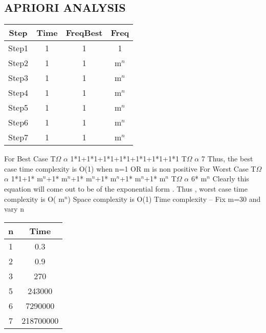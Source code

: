\documentclass[conference]{IEEEtran}
\begin{document}
\subsection{APRIORI ANALYSIS }
\begin{center}
   \begin{tabular}{|c|c|c|c}
   \hline
   Step&Time&FreqBest&Freq \\
   \hline\hline
   Step1 & 1 & 1 &  1 \\
    \hline
   Step2 & 1 & 1 &  m$^{n}$\\
    \hline
   Step3 & 1 & 1 &  m$^{n}$\\
    \hline
   Step4 & 1 & 1 &  m$^{n}$\\
    \hline
  Step5 & 1 & 1 &  m$^{n}$\\
  \hline
  Step6 & 1 & 1 &  m$^{n}$\\
    \hline
    Step7 & 1 & 1 &  m$^{n}$ \\
    \hline
    \end{tabular} 
\end{center}
For Best Case
\newline
T$\Omega$ $\alpha$ 1*1+1*1+1*1+1*1+1*1+1*1+1*1
\newline
T$\Omega$ $\alpha$ 7
\newline
Thus, the best case time complexity is O(1) when n=1 OR m is non positive
\newline
For Worst Case
\newline
T$\Omega$ $\alpha$ 1*1+1* m$^{n}$+1* m$^{n}$+1* m$^{n}$+1* m$^{n}$+1*  m$^{n}$+1* m$^{n}$
\newline
T$\Omega$ $\alpha$ 6* m$^{n}$
\newline
Clearly this equation will come out to be of the exponential form .
\newline
Thus , worst case time complexity is O( m$^{n}$)
\newline
Space complexity is O(1)
\newline
Time complexity –
\newline
Fix m=30 and vary n
\newline
\begin{center}
   \begin{tabular}{|c|c|}
   \hline
   n & Time \\
   \hline\hline
    1 & 0.3 \\
    \hline
    2 & 0.9 \\
    \hline
    3 & 270 \\
    \hline
    5 & 243000 \\
    \hline
    6 & 7290000 \\
    \hline
    7 & 218700000 \\
    \hline
    \end{tabular} 
\end{center}
\end{document}
